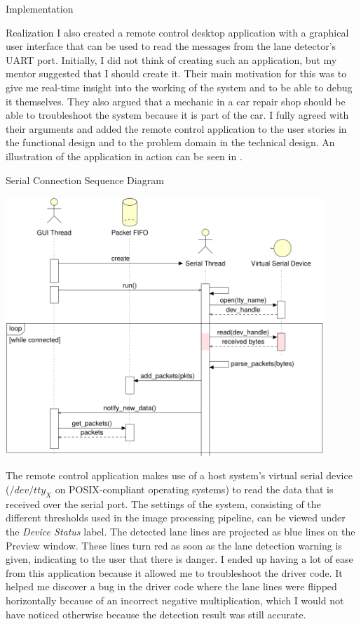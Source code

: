 \documentclass{matthijs}
\begin{document}
\begin{hoofdstuk}{Implementation}
\begin{paragraaf}{Realization}
			I also created a remote control desktop application with a graphical user interface that can be used to read the messages from the lane detector's UART port.
			Initially, I did not think of creating such an application, but my mentor suggested that I should create it.
			Their main motivation for this was to give me real-time insight into the working of the system and to be able to debug it themselves.
			They also argued that a mechanic in a car repair shop should be able to troubleshoot the system because it is part of the car.
			I fully agreed with their arguments and added the remote control application to the user stories in the functional design and to the problem domain in the technical design.
			An illustration of the application in action can be seen in .

			\begin{figuur}{Serial Connection Sequence Diagram}
				\centerline{
					\includegraphics[width=0.9\textwidth]{remote-control-seq.pdf}
				}
			\end{figuur}

			\noindent The remote control application makes use of a host system's virtual serial device ($/dev/tty_{X}$ on POSIX-compliant operating systems) to read the data that is received over the serial port.
			The settings of the system, consisting of the different thresholds used in the image processing pipeline, can be viewed under the \textit{Device Status} label.
			The detected lane lines are projected as blue lines on the Preview window.
			These lines turn red as soon as the lane detection warning is given, indicating to the user that there is danger.
			I ended up having a lot of ease from this application because it allowed me to troubleshoot the driver code.
			It helped me discover a bug in the driver code where the lane lines were flipped horizontally because of an incorrect negative multiplication, which I would not have noticed otherwise because the detection result was still accurate.


\end{paragraaf}
\end{hoofdstuk}
\end{document}
